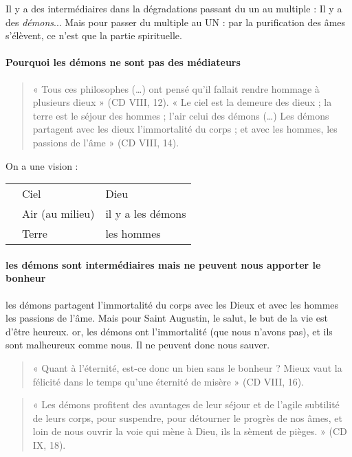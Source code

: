 Il y a des intermédiaires dans la dégradations passant du un au multiple : Il y a des \textit{démons}...
Mais pour passer du multiple au UN : par la purification des âmes s'élèvent,  ce n'est que la partie spirituelle.

\paragraph{Pourquoi les démons ne sont pas des médiateurs}

\begin{quote}
    « Tous ces philosophes (…) ont pensé qu’il fallait rendre hommage à plusieurs dieux » (CD VIII, 12). « Le ciel est la demeure des dieux ; la terre est le séjour des hommes ; l’air celui des démons  (…) Les démons partagent avec les dieux l’immortalité du corps ; et avec les hommes, les passions de l’âme » (CD VIII, 14). 
\end{quote}

On a une vision : 
\begin{table}[h!]
\centering
\begin{tabular}{lll}
 & Ciel        &  Dieu\\
 & Air (au milieu)              &  il y a les démons\\
 & Terre & les hommes
\end{tabular}
\end{table}

\paragraph{les démons sont intermédiaires mais ne peuvent nous apporter le bonheur}
les démons partagent l'immortalité du corps avec les Dieux et avec les hommes les passions de l'âme.
Mais pour Saint Augustin, le salut, le but de la vie est d'être heureux. or, les démons ont l'immortalité (que nous n'avons pas), et ils sont malheureux comme nous. Il ne peuvent donc nous sauver.

\begin{quote}
    « Quant à l’éternité, est-ce donc un bien sans le bonheur ? Mieux vaut la félicité dans le temps qu’une éternité de misère » (CD VIII, 16).  
\end{quote}



\begin{quote}
    « Les démons profitent des avantages de leur séjour et de l’agile subtilité de leurs corps, pour suspendre, pour détourner le progrès de nos âmes, et loin de nous ouvrir la voie qui mène à Dieu, ils la sèment de pièges. » (CD IX, 18). 
\end{quote}
 
